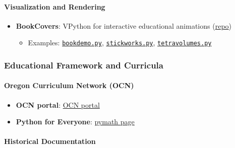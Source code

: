 \documentclass[
  10pt,
]{article}
\newcommand{\passthrough}[1]{#1}
\providecommand{\tightlist}{%
  \setlength{\itemsep}{0pt}\setlength{\parskip}{0pt}}
\begin{document}
\hypertarget{visualization-and-rendering}{%
\paragraph{Visualization and
Rendering}\label{visualization-and-rendering}}

\begin{itemize}
\tightlist
\item
  \textbf{BookCovers}: VPython for interactive educational animations
  (\href{https://github.com/4dsolutions/BookCovers}{repo})

  \begin{itemize}
  \tightlist
  \item
    Examples:
    \href{https://github.com/4dsolutions/BookCovers/blob/master/bookdemo.py}{\passthrough{\lstinline!bookdemo.py!}},
    \href{https://github.com/4dsolutions/BookCovers/blob/master/stickworks.py}{\passthrough{\lstinline!stickworks.py!}},
    \href{https://github.com/4dsolutions/BookCovers/blob/master/tetravolumes.py}{\passthrough{\lstinline!tetravolumes.py!}}
  \end{itemize}
\end{itemize}

\hypertarget{educational-framework-and-curricula}{%
\subsubsection{Educational Framework and
Curricula}\label{educational-framework-and-curricula}}

\hypertarget{oregon-curriculum-network-ocn}{%
\paragraph{Oregon Curriculum Network
(OCN)}\label{oregon-curriculum-network-ocn}}

\begin{itemize}
\tightlist
\item
  \textbf{OCN portal}: \href{http://www.4dsolutions.net/ocn/}{OCN
  portal}
\item
  \textbf{Python for Everyone}:
  \href{http://www.4dsolutions.net/ocn/pymath.html}{pymath page}
\end{itemize}

\hypertarget{historical-documentation}{%
\paragraph{Historical Documentation}\label{historical-documentation}}
\end{document}
